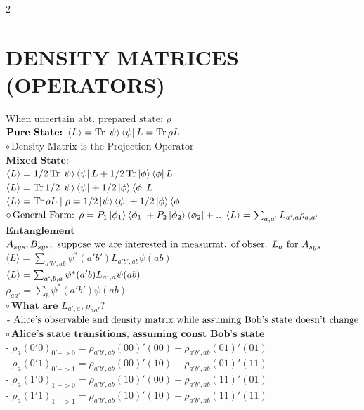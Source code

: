 \documentclass[10pt,a4paper]{article}
\begin{document}
\begin{multicols}{2}
\section{DENSITY MATRICES (OPERATORS)}
$\text{When uncertain abt. prepared state: } \rho$\\
$\textbf{Pure State: }\langle L \rangle = \Tr \ket{\psi}\bra{\psi}L = \Tr \rho L$\\
$\circ\, \text{Density Matrix is the Projection Operator}$\\
$\textbf{Mixed State: }$\\
$ \langle L \rangle = 1/2 \Tr \ket{\psi}\bra{\psi}L  + 1/2\Tr\ket{\phi}\bra{\phi}L$\\
$\langle L \rangle = \Tr 1/2 \ket{\psi}\bra{\psi}+1/2 \ket{\phi}\bra{\phi} L$\\
$\langle L \rangle = \Tr \rho L \mid \rho = 1/2 \ket{\psi}\bra{\psi}+1/2 \ket{\phi}\bra{\phi} $\\
$\circ\,\text{General Form: }\\ \rho = P_1\ket{\phi_1}\bra{\phi_1}+ P_2\ket{\phi_2}\bra{\phi_2} +..$
$\langle L \rangle = \sum_{a,a`}L_{a`,a}\rho_{a,a`}$\\
$\textbf{Entanglement}$\\
$A_{sys}, B_{sys}; \text{ suppose we are interested in measurmt. of obser. } \\L_{a} \text{ for } A_{sys}$\\
$\langle L\rangle  = \sum_{a'b',ab}\psi^*(a'b')L_{a'b',ab}\psi(ab)$\\
$\langle L\rangle  = \sum_{a`,b,a}\psi^*(a'b)L_{a',a}\psi(ab)$\\
$\rho_{aa'} = \sum_{b}\psi^*(a'b')\psi(ab)$\\
$\circ\,\textbf{What are }L_{a',a} , \rho_{aa'} ?$\\
$ \text{- Alice's observable and density matrix while assuming} \\\text{ Bob's state doesn't change}$\\
$\circ\,\textbf{Alice's state transitions, assuming const Bob's state}$\\
$\text{- }\rho_{a}(0'0)_{0'->0} = \rho_{a'b', ab}(00)'(00)+ \rho_{a'b', ab}(01)'(01)$\\
$\text{- }\rho_{a}(0'1)_{0'->1} = \rho_{a'b', ab}(00)'(10)+ \rho_{a'b', ab}(01)'(11)$\\ 
$\text{- }\rho_{a}(1'0)_{1'->0} = \rho_{a'b', ab}(10)'(00)+ \rho_{a'b', ab}(11)'(01)$\\ 
$\text{- }\rho_{a}(1'1)_{1'->1} = \rho_{a'b', ab}(10)'(10)+ \rho_{a'b', ab}(11)'(11)$\\

\end{multicols}
\end{document}
